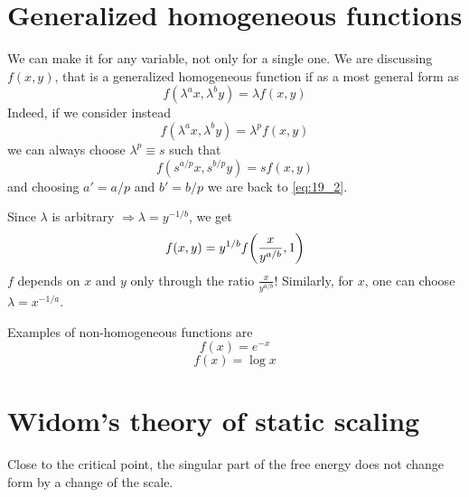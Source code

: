 \documentclass[../main/main.tex]{subfiles}
\begin{document}
\section{Generalized homogeneous functions}
We can make it for any variable, not only for a single one.
We are discussing \( f(x,y) \), that is a generalized homogeneous function if as a most general form as
\begin{equation}
  f (\lambda ^a x, \lambda ^b y) = \lambda f(x,y)
  \label{eq:19_2}
\end{equation}
Indeed, if we consider instead
\begin{equation}
    f (\lambda ^a x, \lambda ^b y) = \lambda^p f(x,y)
\end{equation}
we can always choose \( \lambda ^p \equiv s \) such that
\begin{equation}
  f ( s^{a/p} x, s^{b/p} y) = s f(x,y)
\end{equation}
and choosing \( a'=a/p \) and \( b'=b/p \) we are back to \eqref{eq:19_2}.
\begin{remark}
Since \( \lambda  \) is arbitrary \( \Rightarrow \lambda  = y ^{-1/b} \), we get
\begin{equation}
  f(x,y) = y^{1/b} f \qty( \frac{x}{y^{a/b}},1)
\end{equation}
\( f \) depends on \( x \) and \( y \) only through the ratio \( \frac{x}{y^{a/b}} \)! Similarly, for \( x \), one can choose \( \lambda = x^{-1/a} \).
\end{remark}
\begin{example}
Examples of non-homogeneous functions are
\begin{equation}
  f(x) = e^{-x}
\end{equation}
\begin{equation}
  f(x) = \log{x}
\end{equation}
\end{example}

\section{Widom's theory of static scaling}
Close to the critical point, the singular part of the free energy does not change form by a change of the scale.
\end{document}
